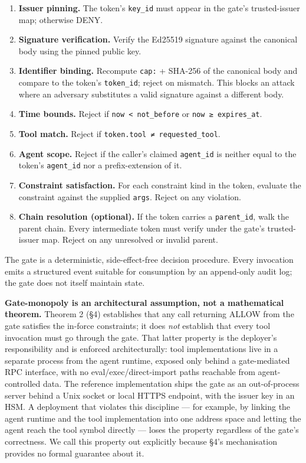 \begin{enumerate}
\def\labelenumi{\arabic{enumi}.}
\tightlist
\item
  \textbf{Issuer pinning.} The token's \texttt{key\_id} must appear in
  the gate's trusted-issuer map; otherwise DENY.
\item
  \textbf{Signature verification.} Verify the Ed25519 signature against
  the canonical body using the pinned public key.
\item
  \textbf{Identifier binding.} Recompute \texttt{cap:} + SHA-256 of the
  canonical body and compare to the token's \texttt{token\_id}; reject
  on mismatch. This blocks an attack where an adversary substitutes a
  valid signature against a different body.
\item
  \textbf{Time bounds.} Reject if \texttt{now\ \textless{}\ not\_before}
  or \texttt{now\ ≥\ expires\_at}.
\item
  \textbf{Tool match.} Reject if
  \texttt{token.tool\ ≠\ requested\_tool}.
\item
  \textbf{Agent scope.} Reject if the caller's claimed
  \texttt{agent\_id} is neither equal to the token's \texttt{agent\_id}
  nor a prefix-extension of it.
\item
  \textbf{Constraint satisfaction.} For each constraint kind in the
  token, evaluate the constraint against the supplied \texttt{args}.
  Reject on any violation.
\item
  \textbf{Chain resolution (optional).} If the token carries a
  \texttt{parent\_id}, walk the parent chain. Every intermediate token
  must verify under the gate's trusted-issuer map. Reject on any
  unresolved or invalid parent.
\end{enumerate}

The gate is a deterministic, side-effect-free decision procedure. Every
invocation emits a structured event suitable for consumption by an
append-only audit log; the gate does not itself maintain state.

\textbf{Gate-monopoly is an architectural assumption, not a mathematical
theorem.} Theorem 2 (§4) establishes that any call returning ALLOW from
the gate satisfies the in-force constraints; it does \emph{not}
establish that every tool invocation must go through the gate. That
latter property is the deployer's responsibility and is enforced
architecturally: tool implementations live in a separate process from
the agent runtime, exposed only behind a gate-mediated RPC interface,
with no eval/exec/direct-import paths reachable from agent-controlled
data. The reference implementation ships the gate as an out-of-process
server behind a Unix socket or local HTTPS endpoint, with the issuer key
in an HSM. A deployment that violates this discipline --- for example,
by linking the agent runtime and the tool implementation into one
address space and letting the agent reach the tool symbol directly ---
loses the property regardless of the gate's correctness. We call this
property out explicitly because §4's mechanisation provides no formal
guarantee about it.

